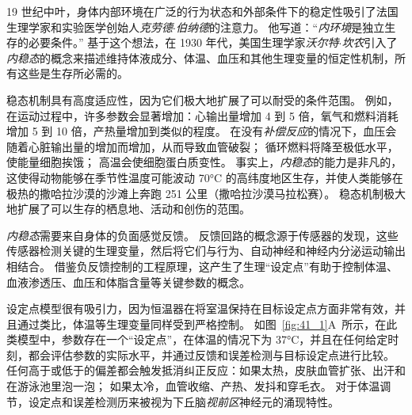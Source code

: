 19 世纪中叶，身体内部环境在广泛的行为状态和外部条件下的稳定性吸引了法国生理学家和实验医学创始人\textit{克劳德$\cdot$伯纳德}的注意力。
他写道：“\textit{内环境}是独立生存的必要条件。” 
基于这个想法，在 1930 年代，美国生理学家\textit{沃尔特$\cdot$坎农}引入了\textit{内稳态}的概念来描述维持体液成分、体温、血压和其他生理变量的恒定性机制，所有这些是生存所必需的。


稳态机制具有高度适应性，因为它们极大地扩展了可以耐受的条件范围。
例如，在运动过程中，许多参数会显著增加：心输出量增加 4 到 5 倍，氧气和燃料消耗增加 5 到 10 倍，产热量增加到类似的程度。
在没有\textit{补偿反应}的情况下，血压会随着心脏输出量的增加而增加，从而导致血管破裂；
循环燃料将降至极低水平，使能量细胞挨饿；
高温会使细胞蛋白质变性。
事实上，\textit{内稳态}的能力是非凡的，这使得动物能够在季节性温度可能波动 70°C 的高纬度地区生存，并使人类能够在极热的撒哈拉沙漠的沙滩上奔跑 251 公里（撒哈拉沙漠马拉松赛）。
稳态机制极大地扩展了可以生存的栖息地、活动和创伤的范围。


\textit{内稳态}需要来自身体的负面感觉反馈。
反馈回路的概念源于传感器的发现，这些传感器检测关键的生理变量，然后将它们与行为、自动神经和神经内分泌运动输出相结合。
借鉴负反馈控制的工程原理，这产生了生理“设定点”有助于控制体温、血液渗透压、血压和体脂含量等关键参数的概念。


设定点模型很有吸引力，因为恒温器在将室温保持在目标设定点方面非常有效，并且通过类比，体温等生理变量同样受到严格控制。
如图~\ref{fig:41_1}A~所示，在此类模型中，参数存在一个“设定点”，在体温的情况下为 37°C，并且在任何给定时刻，都会评估参数的实际水平，并通过反馈和误差检测与目标设定点进行比较。
任何高于或低于的偏差都会触发抵消纠正反应：如果太热，皮肤血管扩张、出汗和在游泳池里泡一泡；
如果太冷，血管收缩、产热、发抖和穿毛衣。
对于体温调节，设定点和误差检测历来被视为下丘脑\textit{视前区}神经元的涌现特性。


